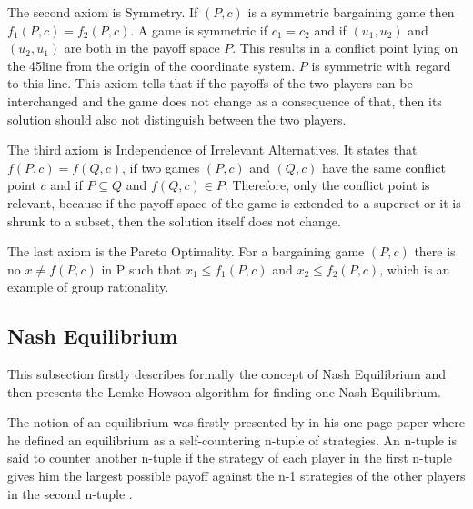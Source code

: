 {The second axiom is Symmetry. If $(P,c)$ is a symmetric bargaining game then $f_1(P,c) = f_2(P,c)$. A game is symmetric if $c_1 = c_2$ and if $(u_1, u_2)$ and $(u_2, u_1)$ are both in the payoff space $P$. This results in a conflict point lying on the 45\textdegree  line from the origin of the coordinate system. $P$ is symmetric with regard to this line. This axiom tells that if the payoffs of the two players can be interchanged and the game does not change as a consequence of that, then its solution should also not distinguish between the two players.

The third axiom is Independence of Irrelevant Alternatives. It states that $f(P,c) = f(Q,c)$, if two games $(P,c)$ and $(Q,c)$ have the same conflict point $c$ and if $P \subseteq Q$ and $f(Q,c) \in P$. Therefore, only the conflict point is relevant, because if the payoff space of the game is extended to a superset or it is shrunk to a subset, then the solution itself does not change.

The last axiom is the Pareto Optimality. For a bargaining game $(P,c)$ there is no $x \neq f(P,c)$ in P such that $x_1 \leq f_1(P,c)$ and $x_2 \leq f_2(P,c)$, which is an example of group rationality.

\subsection{Nash Equilibrium}
This subsection firstly describes formally the concept of Nash Equilibrium and then presents the Lemke-Howson algorithm for finding one Nash Equilibrium.

The notion of an equilibrium was firstly presented by \citet{nash1950equilibrium} in his one-page paper where he defined an equilibrium as a self-countering n-tuple of strategies. An n-tuple is said to counter another n-tuple if the strategy of each player in the first n-tuple gives him the largest possible payoff against the n-1 strategies of the other players in the second n-tuple \citep{nash1950equilibrium}. 

}

